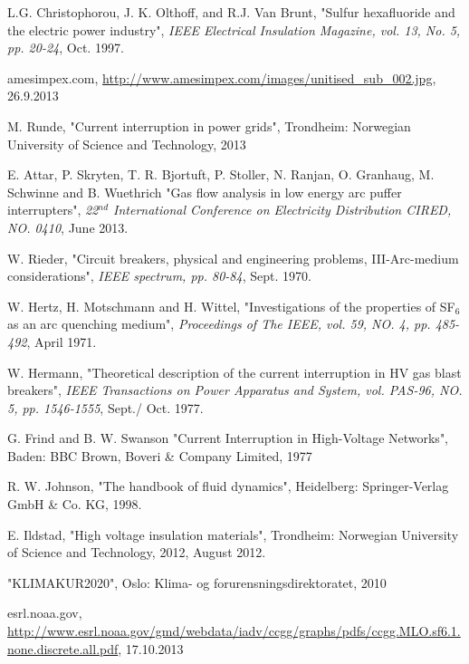 \documentclass[10pt,b5paper,twoside]{article}
\begin{document}
\cleardoublepage

\begin{thebibliography}{10}
 L.G. Christophorou, J. K. Olthoff, and R.J. Van Brunt, "Sulfur hexafluoride and the electric power industry", \textit{IEEE Electrical Insulation Magazine, vol. 13, No. 5, pp. 20-24}, Oct. 1997.

 amesimpex.com, \url{http://www.amesimpex.com/images/unitised_sub_002.jpg}, 26.9.2013

 M. Runde, "Current interruption in power grids", Trondheim: Norwegian University of Science and Technology, 2013

 E. Attar, P. Skryten, T. R. Bjortuft, P. Stoller, N. Ranjan, O. Granhaug, M. Schwinne and B. Wuethrich "Gas flow analysis in low energy arc puffer interrupters", \textit{22$^{nd}$ International Conference on Electricity Distribution CIRED, NO. 0410}, June 2013.

 W. Rieder, "Circuit breakers, physical and engineering problems, III-Arc-medium considerations", \textit{IEEE spectrum, pp. 80-84}, Sept. 1970.

 W. Hertz, H. Motschmann and H. Wittel, "Investigations of the properties of SF$_6$ as an arc quenching medium", \textit{Proceedings of The IEEE, vol. 59, NO. 4, pp. 485-492}, April 1971.

 W. Hermann, "Theoretical description of the current interruption in HV gas blast breakers", \textit{IEEE Transactions on Power Apparatus and System, vol. PAS-96, NO. 5, pp. 1546-1555}, Sept./ Oct. 1977.

 G. Frind and B. W. Swanson "Current Interruption in High-Voltage Networks", Baden: BBC Brown, Boveri \& Company Limited, 1977

 R. W. Johnson, "The handbook of fluid dynamics", Heidelberg: Springer-Verlag GmbH \& Co. KG, 1998.

 E. Ildstad, "High voltage insulation materials", Trondheim: Norwegian University of Science and Technology, 2012, August 2012.

 "KLIMAKUR2020", Oslo: Klima- og forurensningsdirektoratet, 2010

 esrl.noaa.gov, \url{http://www.esrl.noaa.gov/gmd/webdata/iadv/ccgg/graphs/pdfs/ccgg.MLO.sf6.1.none.discrete.all.pdf}, 17.10.2013


\end{thebibliography}
\end{document}
